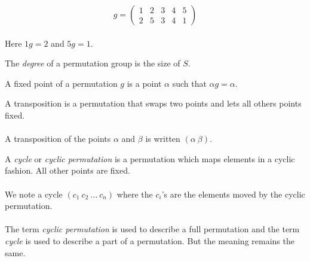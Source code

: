 \[
  g =
  \left(
    \begin{array}{ccccc}
      1 & 2 & 3 & 4 & 5\\
      2 & 5 & 3 & 4 & 1
    \end{array}
  \right)
\]

\paragraph{}
Here $1g = 2$ and $5g = 1$.

\begin{definition}
  The \textit{degree} of a permutation group is the size of $S$.
\end{definition}

\begin{definition}
  A fixed point of a permutation $g$ is a point $\alpha$ such that $\alpha g = \alpha$.
\end{definition}

\begin{definition}[Transposition]
  A transposition is a permutation that swaps two points and lets all others points fixed.
\end{definition}

\paragraph{}
A transposition of the points $\alpha$ and $\beta$ is written $(\alpha\ \beta)$.

\begin{definition}[Cycle]
  A \textit{cycle} or \textit{cyclic permutation} is a permutation which maps elements in a cyclic fashion. All other points are fixed.
\end{definition}

\paragraph{}
We note a cycle $(c_1\ c_2\ \dots\ c_n)$ where the $c_i$'s are the elements moved by the cyclic permutation.

\paragraph{}
The term \textit{cyclic permutation} is used to describe a full permutation and the term \textit{cycle} is used to describe a part of a permutation. But the meaning remains the same.

